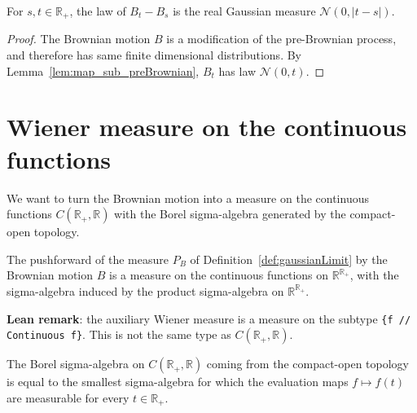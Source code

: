 \begin{lemma}\label{lem:measurePreserving_brownian_sub}
  \leanok
For $s, t \in \mathbb{R}_+$, the law of $B_t - B_s$ is the real Gaussian measure $\mathcal{N}(0,\vert t - s \vert)$.
\end{lemma}

\begin{proof}\leanok
The Brownian motion $B$ is a modification of the pre-Brownian process, and therefore has same finite dimensional distributions. By Lemma~\ref{lem:map_sub_preBrownian}, $B_t$ has law $\mathcal{N}(0,t)$.
\end{proof}

\section{Wiener measure on the continuous functions}

We want to turn the Brownian motion into a measure on the continuous functions $C(\mathbb{R}_+, \mathbb{R})$ with the Borel sigma-algebra generated by the compact-open topology.


\begin{definition}\label{def:wienerMeasureAux}
  \leanok
The pushforward of the measure $P_B$ of Definition~\ref{def:gaussianLimit} by the Brownian motion $B$ is a measure on the continuous functions on $\mathbb{R}^{\mathbb{R}_+}$, with the sigma-algebra induced by the product sigma-algebra on $\mathbb{R}^{\mathbb{R}_+}$.
\end{definition}

\textbf{Lean remark}: the auxiliary Wiener measure is a measure on the subtype \texttt{\{f  // Continuous f\}}. This is not the same type as $C(\mathbb{R}_+, \mathbb{R})$.


\begin{theorem}\label{thm:ContinuousMap.borel_eq_iSup_comap_eval}
  \leanok
The Borel sigma-algebra on $C(\mathbb{R}_+, \mathbb{R})$ coming from the compact-open topology is equal to the smallest sigma-algebra for which the evaluation maps $f \mapsto f(t)$ are measurable for every $t \in \mathbb{R}_+$.
\end{theorem}

